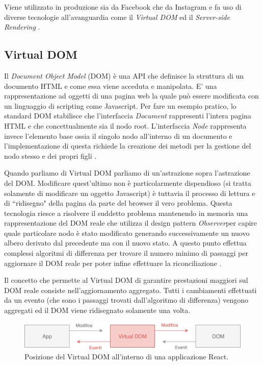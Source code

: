 Viene utilizzato in produzione sia da Facebook che da Instagram e fa uso di diverse tecnologie all'avanguardia come il \textit{Virtual DOM} ed il \textit{Server-side Rendering} \cite{WheelerOnReact}.

\subsection{Virtual DOM}
Il  \textit{Document Object Model} (DOM) è una API che definisce la struttura di un documento HTML e come essa viene acceduta e manipolata. E' una rappresentazione ad oggetti di una pagina web la quale può essere modificata con un linguaggio di scripting come Javascript.
Per fare un esempio pratico, lo standard DOM stabilisce che l'interfaccia \textit{Document} rappresenti l'intera pagina HTML e che concettualmente sia il nodo root. L'interfaccia \textit{Node} rappresenta invece l'elemento base ossia il singolo nodo all'interno di un documento e l'implementazione di questa richiede la creazione dei metodi per la gestione del nodo stesso e dei propri figli \cite{HWRWhatIsDOM}.

Quando parliamo di Virtual DOM parliamo di un'astrazione sopra l'astrazione del DOM. Modificare quest'ultimo non è particolarmente dispendioso (si tratta solamente di modificare un oggetto Javascript) è tuttavia il processo di lettura e di “ridisegno" della pagina da parte del browser il vero problema. Questa tecnologia riesce a risolvere il suddetto problema mantenendo in memoria una rappresentazione del DOM reale che utilizza il design pattern \textit{Observer}\footnotemark per capire quale particolare nodo è stato modificato generando successivamente un nuovo albero derivato dal precedente ma con il nuovo stato. A questo punto effettua complessi algoritmi di differenza per trovare il numero minimo di passaggi per aggiornare il DOM reale per poter infine effettuare la riconciliazione \cite{MishraOnVirtualDOM}.

Il concetto che permette al Virtual DOM di garantire prestazioni maggiori sul DOM reale consiste nell'aggiornamento aggregato. Tutti i cambiamenti effettuati da un evento (che sono i passaggi trovati dall'algoritmo di differenza) vengono aggregati ed il DOM viene ridisegnato solamente una volta.

\begin{figure}[h]
\centering 
\includegraphics[width=13cm]{./images/virtualDOMWorkflow}
\caption{Posizione del Virtual DOM all'interno di una applicazione React.}
\end{figure}

